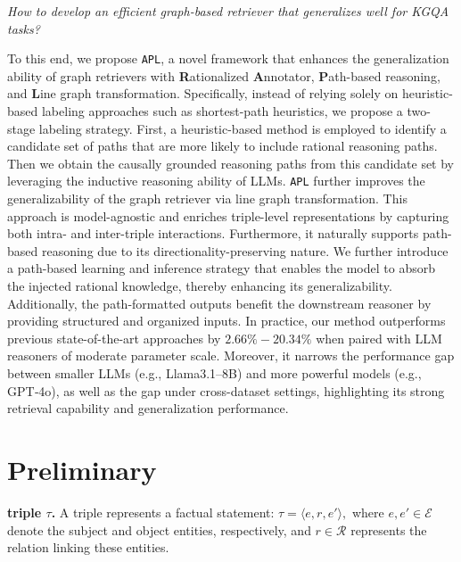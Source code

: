 \documentclass{article}
\theoremstyle{plain}
\theoremstyle{definition}
\theoremstyle{remark}
\newcommand{\ti}[1]{\textit{#1}}
\newcommand{\tb}[1]{\textbf{#1}}
\newcommand{\mcal}[1]{\mathcal{#1}}
\newcommand{\proj}{\texttt{\scalebox{1.03}{R}APL}}
\begin{document}
\ti{How to develop an efficient graph-based retriever that generalizes well for KGQA tasks?}

 To this end, we propose \proj, a novel framework that enhances the generalization ability of graph retrievers with \tb{R}ationalized \tb{A}nnotator, \tb{P}ath-based reasoning, and \tb{L}ine graph transformation.
 Specifically,  instead of relying solely on heuristic-based labeling approaches such as shortest-path heuristics, we propose a two-stage labeling strategy. First, a heuristic-based method is employed to identify a candidate set of paths that are more likely to include rational reasoning paths. Then we obtain the causally grounded reasoning paths from this candidate set by leveraging the inductive reasoning ability of LLMs.  \proj{} further improves the generalizability of the graph retriever via line graph transformation. This approach is model-agnostic and enriches triple-level representations by capturing both intra- and inter-triple interactions. Furthermore, it naturally supports path-based reasoning due to its directionality-preserving nature.  We further introduce a path-based learning and inference strategy that enables the model to absorb the injected rational knowledge, thereby enhancing its generalizability. Additionally, the path-formatted outputs benefit the downstream reasoner by providing structured and organized inputs. In practice, our method outperforms previous state-of-the-art approaches by $2.66\%-20.34\%$ when paired with LLM reasoners of moderate parameter scale. Moreover, it narrows the performance gap between smaller LLMs (e.g., Llama3.1–8B) and more powerful models (e.g., GPT‑4o), as well as the gap under cross-dataset settings, highlighting its strong retrieval capability and generalization performance. 
 \vspace{-10pt}
\section{Preliminary}

\noindent\tb{triple $\tau$.}
A triple represents a factual statement:
$
\tau = \langle e, r, e' \rangle,
$
where $e, e' \in \mcal{E}$ denote the subject and object entities, respectively, and $r \in \mcal{R}$ represents the relation linking these entities.
\end{document}
